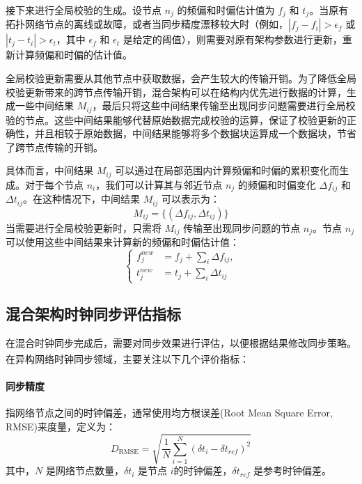 \documentclass[UTF8,a4paper,12pt]{ctexart}
\numberwithin{equation}{section}
\begin{document}
接下来进行全局校验的生成。设节点 $n_j$ 的频偏和时偏估计值为 $f_j$ 和 $t_j$。当原有拓扑网络节点的离线或故障，或者当同步精度漂移较大时（例如，$|f_j - f_i| > \epsilon_f$ 或 $|t_j - t_i| > \epsilon_t$，其中 $\epsilon_f$ 和 $\epsilon_t$ 是给定的阈值），则需要对原有架构参数进行更新，重新计算频偏和时偏的估计值。

全局校验更新需要从其他节点中获取数据，会产生较大的传输开销。为了降低全局校验更新带来的跨节点传输开销，混合架构可以在结构内优先进行数据的计算，生成一些中间结果 $M_{ij}$，最后只将这些中间结果传输至出现同步问题需要进行全局校验的节点。这些中间结果能够代替原始数据完成校验的运算，保证了校验更新的正确性，并且相较于原始数据，中间结果能够将多个数据块运算成一个数据块，节省了跨节点传输的开销。

具体而言，中间结果 $M_{ij}$ 可以通过在局部范围内计算频偏和时偏的累积变化而生成。对于每个节点 $n_i$，我们可以计算其与邻近节点 $n_j$ 的频偏和时偏变化 $\Delta f_{ij}$ 和 $\Delta t_{ij}$。在这种情况下，中间结果 $M_{ij}$ 可以表示为：
\begin{equation}
	M_{ij} = \{(\Delta f_{ij}, \Delta t_{ij})\}
\end{equation}
当需要进行全局校验更新时，只需将 $M_{ij}$ 传输至出现同步问题的节点 $n_j$。节点 $n_j$ 可以使用这些中间结果来计算新的频偏和时偏估计值：
\begin{equation}
	\left\{
	\begin{aligned}
	f_j^{new} &= f_j + \sum_{i} \Delta f_{ij},\\
	t_j^{new} &= t_j + \sum_{i} \Delta t_{ij}
	\end{aligned}
	\right.
\end{equation}


\subsection{混合架构时钟同步评估指标}

在混合时钟同步完成后，需要对同步效果进行评估，以便根据结果修改同步策略。在异构网络时钟同步领域，主要关注以下几个评价指标\textsuperscript{\cite{chi2018ear}}：
	\paragraph{同步精度}指网络节点之间的时钟偏差，通常使用均方根误差(Root Mean Square Error, RMSE)来度量，定义为：
	\begin{equation}
		D_\text{RMSE} = \sqrt{\frac{1}{N} \sum_{i=1}^{N} (\delta t_{i} - \delta t_{ref})^2}
	\end{equation}
其中，$N$ 是网络节点数量，$\delta t_{i}$ 是节点 $i$的时钟偏差，$\delta t_{ref}$ 是参考时钟偏差。
\end{document}
